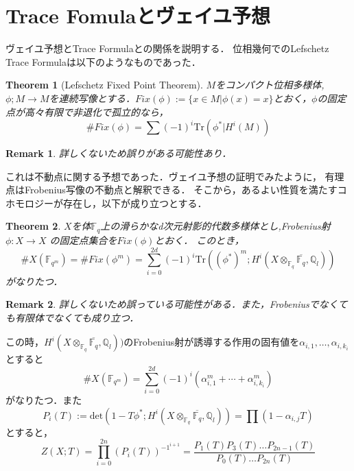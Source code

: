 \documentclass{ujarticle}
\newtheorem{thm}{Theorem}[section]
\newtheorem*{rem}{Remark}
\begin{document}
\section{Trace Fomulaとヴェイユ予想}
\label{Trace Fomulaとヴェイユ予想}
ヴェイユ予想とTrace Formulaとの関係を説明する．
位相幾何でのLefschetz Trace Formulaは以下のようなものであった．
\begin{thm}[Lefschetz Fixed Point Theorem]
 $M$をコンパクト位相多様体,$\phi;M \to M$を連続写像とする．$Fix(\phi):=\{ x \in M |\phi (x)=x\}$とおく，$\phi$の固定点が高々有限で非退化で孤立的なら，
 \begin{equation*}
   \#Fix(\phi) = \sum(-1)^i \mathrm{Tr}(\phi^*| H^i(M))
 \end{equation*}
\end{thm}
\begin{rem}
 詳しくないため誤りがある可能性あり．
\end{rem}
これは不動点に関する予想であった．ヴェイユ予想の証明でみたように，
有理点はFrobenius写像の不動点と解釈できる．
そこから，あるよい性質を満たすコホモロジーが存在し，以下が成り立つとする．
\begin{thm}
  $X$を体$\mathbb{F}_q$上の滑らかなd次元射影的代数多様体とし,Frobenius射$\phi: X \to X$ の固定点集合を$Fix(\phi)$とおく．
このとき，
\begin{equation*}
  \#X(\mathbb{F}_{q^m})=\#Fix(\phi^m)= \sum_{i=0}^{2d}(-1)^i
  \mathrm{Tr}((\phi^{*})^m;H^i(X \otimes_{\mathbb{F}_q} \overline{\mathbb{F}_q}, \mathbb{Q}_l))
\end{equation*}
がなりたつ．
\end{thm}
\begin{rem}
 詳しくないため誤っている可能性がある．また，Frobeniusでなくても有限体でなくても成り立つ．
\end{rem}
この時，$H^i(X \otimes_{\mathbb{F}_q} \overline{\mathbb{F}_q}, \mathbb{Q}_l))$のFrobenius射が誘導する作用の固有値を$\alpha_{i,1},\dots,\alpha_{i,k_i}$とすると
\begin{equation*}
　\#X(\mathbb{F}_{q^m})=\sum_{i=0}^{2d}(-1)^i(\alpha_{i,1}^m + \cdots + \alpha_{i,k_i}^m)
\end{equation*}
がなりたつ．また
\begin{equation*}
  P_i(T):=\mathrm{det}(1-T\phi^{*};H^i(X \otimes_{\mathbb{F}_q} \overline{\mathbb{F}_q}, \mathbb{Q}_l))=\prod(1-\alpha_{i,j}T)
\end{equation*}
とすると，
\begin{equation*}
 Z(X;T)=\prod_{i=0}^{2n}(P_i(T))^{{-1}^{i+1}}= \frac{P_1(T)P_3(T)\dots P_{2n-1}(T)}{P_0(T)\dots P_{2n}(T)}
\end{equation*}
\end{document}

